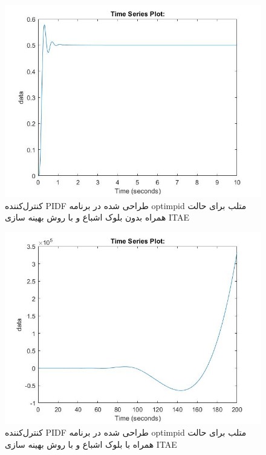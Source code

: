 \begin{figure}[H]
	\centering
	\includegraphics[width=12cm]{../Figure/P_IV/PID_ITAE_without_sat.jpg}
	\caption{کنترل‌کننده PIDF طراحی شده در برنامه optimpid متلب برای حالت همراه بدون بلوک اشباع و با روش بهینه سازی ITAE}
\end{figure}


\begin{figure}[H]
	\centering
	\includegraphics[width=12cm]{../Figure/P_IV/PID_ITSE_with_sat.jpg}
	\caption{کنترل‌کننده PIDF طراحی شده در برنامه optimpid متلب برای حالت همراه با بلوک اشباع و با روش بهینه سازی ITAE}
\end{figure}

%

